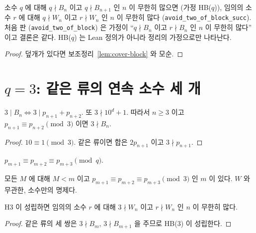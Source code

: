 \begin{theorem}[블록 조건에서 Q1, \(|S| = 2\), C6]
  \label{thm:two-of-block}
  \leanok
  소수 \(q\) 에 대해 \(q \nmid B_n\) 이고 \(q \nmid B_{n+1}\) 인 \(n\) 이 무한히 많으면 (가정 HB(\(q\))),
  임의의 소수 \(r\) 에 대해 \(q \nmid W_n\) 이고 \(r \nmid W_n\) 인 \(n\) 이 무한히 많다
  (\texttt{avoid\_two\_of\_block\_succ}). 처음 판 (\texttt{avoid\_two\_of\_block}) 은 가정이
  ``\(q \nmid B_n\) 이고 \(r \nmid B_n\) 인 \(n\) 이 무한히 많다'' 이고 결론은 같다.
  HB(\(q\)) 는 Lean 정의가 아니라 정리의 가정으로만 나타난다.
\end{theorem}
\begin{proof}
  \leanok
  덮개가 있다면 보조정리~\ref{lem:cover-block} 와 모순.
\end{proof}

\section{\(q = 3\): 같은 류의 연속 소수 세 개}

\begin{lemma}[\(3\) 과 블록, C7]
  \label{lem:three-B}
  \leanok
  \(3 \mid B_n \iff 3 \mid p_{n+1} + p_{n+2}\). 또 \(3 \nmid 10^d + 1\).
  따라서 \(n \ge 3\) 이고 \(p_{n+1} \equiv p_{n+2} \pmod 3\) 이면 \(3 \nmid B_n\).
\end{lemma}
\begin{proof}
  \leanok
  \(10 \equiv 1 \pmod 3\). 같은 류이면 합은 \(2 p_{n+1}\) 이고 \(3 \nmid p_{n+1}\).
\end{proof}

\begin{definition}[같은 류의 세 쌍]
  \label{def:same-class-triple}
  \leanok
  \(p_{m+1} \equiv p_{m+2} \equiv p_{m+3} \pmod q\).
\end{definition}

\begin{definition}[가정 H3]
  \label{def:H3}
  \leanok
  모든 \(M\) 에 대해 \(M < m\) 이고 \(p_{m+1} \equiv p_{m+2} \equiv p_{m+3} \pmod 3\) 인 \(m\) 이 있다.
  \(W\) 와 무관한, 소수만의 명제다.
\end{definition}

\begin{theorem}[H3 에서 Q1, \(S = \{3, r\}\), C7]
  \label{thm:three-of-triples}
  \leanok
  H3 이 성립하면 임의의 소수 \(r\) 에 대해 \(3 \nmid W_n\) 이고 \(r \nmid W_n\) 인 \(n\) 이 무한히 많다.
\end{theorem}
\begin{proof}
  \leanok
  같은 류의 세 쌍은 \(3 \nmid B_m\), \(3 \nmid B_{m+1}\) 을 주므로 HB(3) 이 성립한다.
\end{proof}

